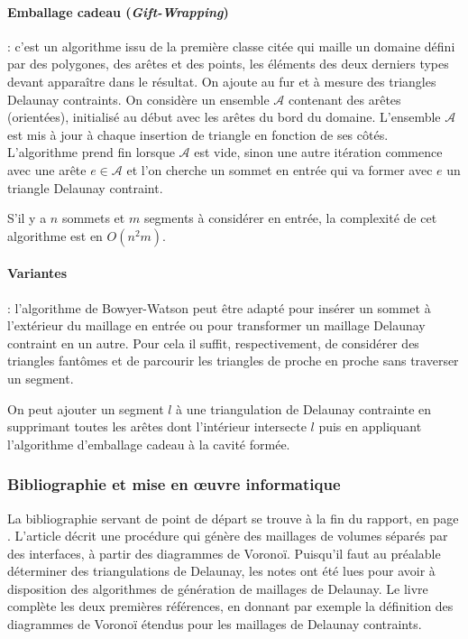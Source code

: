 \documentclass[12pt,a4paper]{report}
\begin{document}
\paragraph{Emballage cadeau (\emph{Gift-Wrapping})} : c'est un algorithme issu de la première classe citée qui maille un domaine défini par des polygones, des arêtes et des points, les éléments des deux derniers types devant apparaître dans le résultat. On ajoute au fur et à mesure des triangles Delaunay contraints. On considère un ensemble $\mathcal{A}$ contenant des arêtes (orientées), initialisé au début avec les arêtes du bord du domaine. L'ensemble $\mathcal{A}$ est mis à jour à chaque insertion de triangle en fonction de ses côtés. L'algorithme prend fin lorsque $\mathcal{A}$ est vide, sinon une autre itération commence avec une arête $e\in\mathcal{A}$ et l'on cherche un sommet en entrée qui va former avec $e$ un triangle Delaunay contraint.

S'il y a $n$ sommets et $m$ segments à considérer en entrée, la complexité de cet algorithme est en $O(n^{2}m)$.

\paragraph{Variantes} : l'algorithme de Bowyer-Watson peut être adapté pour insérer un sommet à l'extérieur du maillage en entrée ou pour transformer un maillage Delaunay contraint en un autre. Pour cela il suffit, respectivement, de considérer des triangles \og fantômes \fg{} et de parcourir les triangles de proche en proche sans traverser un segment.

On peut ajouter un segment $l$ à une triangulation de Delaunay contrainte en supprimant toutes les arêtes dont l'intérieur intersecte $l$ puis en appliquant l'algorithme d'emballage cadeau à la cavité formée.

\vspace{1cm}
\subsubsection{Bibliographie et mise en \oe{}uvre informatique}

La bibliographie servant de point de départ se trouve à la fin du rapport, en page \pageref{biblio}. L'article \cite{Garimella} décrit une procédure qui génère des maillages de volumes séparés par des interfaces, à partir des diagrammes de Voronoï. Puisqu'il faut au préalable déterminer des triangulations de Delaunay, les notes \cite{delnotes} ont été lues pour avoir à disposition des algorithmes de génération de maillages de Delaunay. Le livre \cite{Edelsbrunner} complète les deux premières références, en donnant par exemple la définition des diagrammes de Voronoï étendus pour les maillages de Delaunay contraints.
\end{document}
